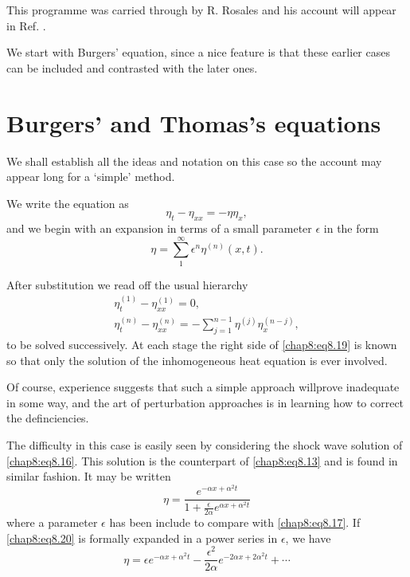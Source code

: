 This programme was carried through by R. Rosales and his account will appear in Ref. \cite{key18}.

We start with Burgers' equation, since a nice feature is that these earlier cases can be included and contrasted with the later ones.

\section{Burgers' and Thomas's equations}\label{chap8:sec8.3}

We shall establish all the ideas and notation on this case so the account may appear long for a `simple' method.

We write the equation as 
\begin{equation}
\eta_t-\eta_{xx}= -\eta\eta_x,\tag{8.16}\label{chap8:eq8.16}
\end{equation}
and we begin with an expansion in terms of a small parameter $\epsilon$ in the form
\begin{equation}
\eta=\sum\limits_1^\infty \epsilon^n\eta^{(n)}(x,t). \tag{8.17}\label{chap8:eq8.17}
\end{equation}

After substitution we read off the usual hierarchy
\begin{gather}
\eta_t^{(1)}-\eta_{xx}^{(1)}=0,\tag{8.18}\label{chap8:eq8.18}\\
\eta_t^{(n)}-\eta_{xx}^{(n)}=-\sum\limits_{j=1}^{n-1}\eta^{(j)}\eta_x^{(n-j)}, \tag{8.19}\label{chap8:eq8.19}
\end{gather}
to be solved successively. At each stage the right side of \eqref{chap8:eq8.19} is known so that only the solution of the inhomogeneous heat equation is ever involved. 

Of course, experience suggests that such a simple approach will\pageoriginale prove inadequate in some way, and the art of perturbation approaches is in learning how to correct the definciencies.

The difficulty in this case is easily seen by considering the shock wave solution of \eqref{chap8:eq8.16}. This solution is the counterpart of \eqref{chap8:eq8.13} and is found in similar fashion. It may be written
\begin{equation}
\eta =\frac{e^{-\alpha x+\alpha^2 t}}{1+\frac{\epsilon}{2\alpha}e^{\alpha x+\alpha^2 t}} \tag{8.20}\label{chap8:eq8.20}
\end{equation}
where a parameter $\epsilon$ has been include to compare with \eqref{chap8:eq8.17}. If \eqref{chap8:eq8.20} is formally expanded in a power series in $\epsilon$, we have 
\begin{equation}
\eta=\epsilon e^{-\alpha x+\alpha^2 t}-\frac{\epsilon^2}{2\alpha}e^{-2\alpha x+2\alpha^2 t}+\cdots \tag{8.21}\label{chap8:eq8.21}
\end{equation}

